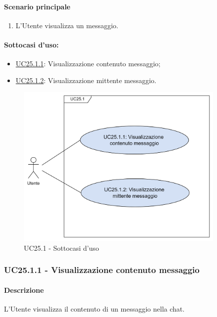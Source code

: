 \paragraph*{Scenario principale}
\begin{enumerate}
  \item L'Utente visualizza un messaggio.
\end{enumerate}

\paragraph*{Sottocasi d'uso:}
\begin{itemize}
  \item \hyperref[UC25point1point1]{UC25.1.1}: Visualizzazione contenuto messaggio;
  \item \hyperref[UC25point1point2]{UC25.1.2}: Visualizzazione mittente messaggio.
\end{itemize}

\begin{figure}[H]
  \centering
  \includegraphics[width=0.90\textwidth]{assets/uc25_1.png}
  \caption{UC25.1 - Sottocasi d'uso}
\end{figure}


\subsubsection{UC25.1.1 - Visualizzazione contenuto messaggio}\label{UC25point1point1}
\paragraph*{Descrizione}
L'Utente visualizza il contenuto di un messaggio nella chat. 

